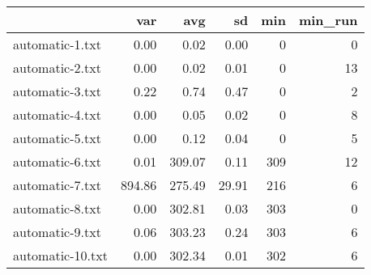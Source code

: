 \begin{tabular}{lrrrrr}
  \toprule  & var & avg & sd & min & min\_run \\ 
  \midrule automatic-1.txt & 0.00 & 0.02 & 0.00 & 0 & 0 \\ 
  automatic-2.txt & 0.00 & 0.02 & 0.01 & 0 & 13 \\ 
  automatic-3.txt & 0.22 & 0.74 & 0.47 & 0 & 2 \\ 
  automatic-4.txt & 0.00 & 0.05 & 0.02 & 0 & 8 \\ 
  automatic-5.txt & 0.00 & 0.12 & 0.04 & 0 & 5 \\ 
  automatic-6.txt & 0.01 & 309.07 & 0.11 & 309 & 12 \\ 
  automatic-7.txt & 894.86 & 275.49 & 29.91 & 216 & 6 \\ 
  automatic-8.txt & 0.00 & 302.81 & 0.03 & 303 & 0 \\ 
  automatic-9.txt & 0.06 & 303.23 & 0.24 & 303 & 6 \\ 
  automatic-10.txt & 0.00 & 302.34 & 0.01 & 302 & 6 \\ 
   \bottomrule \end{tabular}
